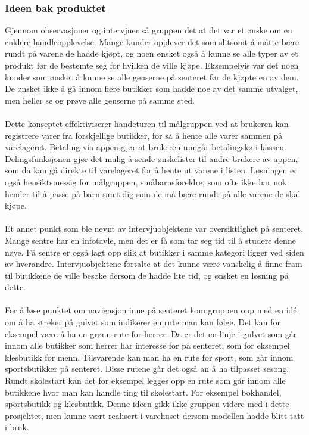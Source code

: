 \subsubsection{Ideen bak produktet}
Gjennom observasjoner og intervjuer så gruppen det at det var et ønske om en enklere handleopplevelse. Mange kunder opplever det som slitsomt å måtte bære rundt på varene de hadde kjøpt, og noen ønsket også å kunne se alle typer av et produkt før de bestemte seg for hvilken de ville kjøpe. Eksempelvis var det noen kunder som ønsket å kunne se alle genserne på senteret før de kjøpte en av dem. De ønsket ikke å gå innom flere butikker som hadde noe av det samme utvalget, men heller se og prøve alle genserne på samme sted.
\\\\
Dette konseptet effektiviserer handeturen til målgruppen ved at brukeren kan registrere varer fra forskjellige butikker, for så å hente alle varer sammen på varelageret. Betaling via appen gjør at brukeren unngår betalingskø i kassen. Delingsfunksjonen gjør det mulig å sende ønskelister til andre brukere av appen, som da kan gå direkte til varelageret for å hente ut varene i listen. Løsningen er også hensiktsmessig for målgruppen, småbarnsforeldre, som ofte ikke har nok hender til å passe på barn samtidig som de må bære rundt på alle varene de skal kjøpe.
\\\\
Et annet punkt som ble nevnt av intervjuobjektene var oversiktlighet på senteret. Mange sentre har en infotavle, men det er få som tar seg tid til å studere denne nøye. Få sentre er også lagt opp slik at butikker i samme kategori ligger ved siden av hverandre. Intervjuobjektene fortalte at det kunne være vanskelig å finne fram til butikkene de ville besøke dersom de hadde lite tid, og ønsket en løsning på dette. 
\\\\	
For å løse punktet om navigasjon inne på senteret kom gruppen opp med en idé om å ha streker på gulvet som indikerer en rute man kan følge. Det kan for eksempel være å ha en grønn rute for herrer. Da er det en linje i gulvet som går innom alle butikker som herrer har interesse for på senteret, som for eksempel klesbutikk for menn. Tilsvarende kan man ha en rute for sport, som går innom sportsbutikker på senteret. Disse rutene går det også an å ha tilpasset sesong. Rundt skolestart kan det for eksempel legges opp en rute som går innom alle butikkene hvor man kan handle ting til skolestart. For eksempel bokhandel, sportsbutikk og klesbutikk. Denne ideen gikk ikke gruppen videre med i dette prosjektet, men kunne vært realisert i varehuset dersom modellen hadde blitt tatt i bruk.
